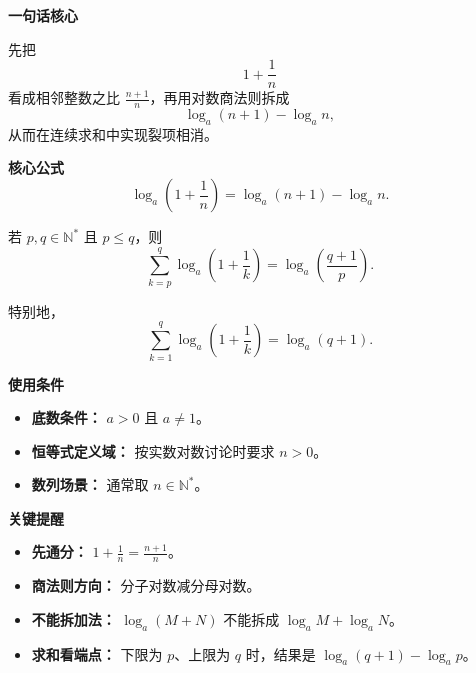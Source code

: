 \begin{summarybox}
	\textbf{\textcolor{CSummary}{一句话核心}}

	先把
	\[
		1+\frac{1}{n}
	\]
	看成相邻整数之比 \(\frac{n+1}{n}\)，再用对数商法则拆成
	\[
		\log_a(n+1)-\log_a n,
	\]
	从而在连续求和中实现裂项相消。

	\medskip
	\textbf{\textcolor{CSummary}{核心公式}}
	\[
		\boxed{
			\log_a\!\left(1+\frac{1}{n}\right)
			=\log_a(n+1)-\log_a n
		}.
	\]

	若 \(p,q\in\mathbb N^*\) 且 \(p\leq q\)，则
	\[
		\boxed{
			\sum_{k=p}^{q}\log_a\!\left(1+\frac{1}{k}\right)
			=\log_a\!\left(\frac{q+1}{p}\right)
		}.
	\]

	特别地，
	\[
		\sum_{k=1}^{q}\log_a\!\left(1+\frac{1}{k}\right)
		=\log_a(q+1).
	\]

	\medskip
	\textbf{\textcolor{CSummary}{使用条件}}
	\begin{itemize}[leftmargin=*, itemsep=0.5em, topsep=0.4em]
		\item \textbf{底数条件：} \(a>0\) 且 \(a\neq1\)。
		\item \textbf{恒等式定义域：} 按实数对数讨论时要求 \(n>0\)。
		\item \textbf{数列场景：} 通常取 \(n\in\mathbb N^*\)。
	\end{itemize}

	\medskip
	\textbf{\textcolor{CSummary}{关键提醒}}
	\begin{itemize}[leftmargin=*, itemsep=0.5em, topsep=0.4em]
		\item \textbf{先通分：} \(1+\frac{1}{n}=\frac{n+1}{n}\)。
		\item \textbf{商法则方向：} 分子对数减分母对数。
		\item \textbf{不能拆加法：} \(\log_a(M+N)\) 不能拆成 \(\log_aM+\log_aN\)。
		\item \textbf{求和看端点：} 下限为 \(p\)、上限为 \(q\) 时，结果是 \(\log_a(q+1)-\log_a p\)。
	\end{itemize}
\end{summarybox}